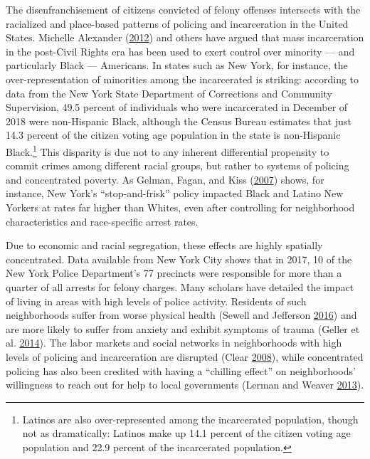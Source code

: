 \documentclass[
  12pt,
]{article}
\begin{document}
The disenfranchisement of citizens convicted of felony offenses intersects with the racialized and place-based patterns of policing and incarceration in the United States. Michelle Alexander (\protect\hyperlink{ref-Alexander2012}{2012}) and others have argued that mass incarceration in the post-Civil Rights era has been used to exert control over minority --- and particularly Black --- Americans. In states such as New York, for instance, the over-representation of minorities among the incarcerated is striking: according to data from the New York State Department of Corrections and Community Supervision, 49.5 percent of individuals who were incarcerated in December of 2018 were non-Hispanic Black, although the Census Bureau estimates that just 14.3 percent of the citizen voting age population in the state is non-Hispanic Black.\footnote{Latinos are also over-represented among the incarcerated population, though not as dramatically: Latinos make up 14.1 percent of the citizen voting age population and 22.9 percent of the incarcerated population.} This disparity is due not to any inherent differential propensity to commit crimes among different racial groups, but rather to systems of policing and concentrated poverty. As Gelman, Fagan, and Kiss (\protect\hyperlink{ref-Gelman2007}{2007}) shows, for instance, New York's ``stop-and-frisk'' policy impacted Black and Latino New Yorkers at rates far higher than Whites, even after controlling for neighborhood characteristics and race-specific arrest rates.

Due to economic and racial segregation, these effects are highly spatially concentrated. Data available from New York City shows that in 2017, 10 of the New York Police Department's 77 precincts were responsible for more than a quarter of all arrests for felony charges. Many scholars have detailed the impact of living in areas with high levels of police activity. Residents of such neighborhoods suffer from worse physical health (Sewell and Jefferson \protect\hyperlink{ref-Sewell2016}{2016}) and are more likely to suffer from anxiety and exhibit symptoms of trauma (Geller et al. \protect\hyperlink{ref-Geller2014}{2014}). The labor markets and social networks in neighborhoods with high levels of policing and incarceration are disrupted (Clear \protect\hyperlink{ref-Clear2008}{2008}), while concentrated policing has also been credited with having a ``chilling effect'' on neighborhoods' willingness to reach out for help to local governments (Lerman and Weaver \protect\hyperlink{ref-Lerman2013}{2013}).
\end{document}
